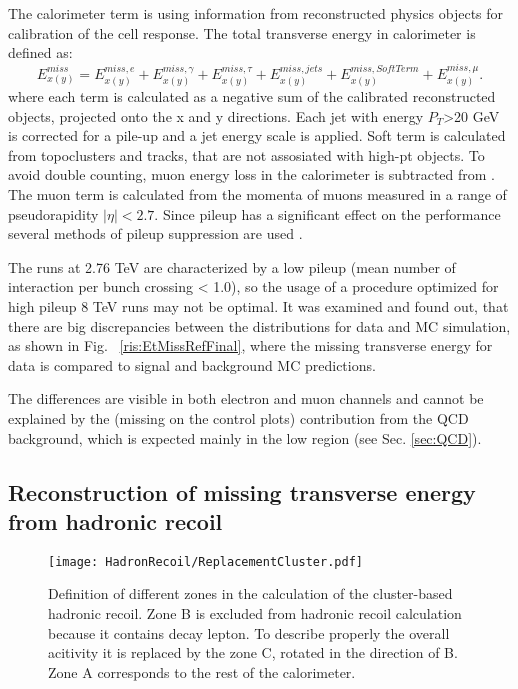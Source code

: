 The calorimeter term is using information from reconstructed physics objects for calibration of the cell response. The total transverse energy in calorimeter is defined as:
\begin{equation}
E_{x(y)}^{miss} = E_{x(y)}^{miss, e} + E_{x(y)}^{miss, \gamma} + E_{x(y)}^{miss, \tau} + E_{x(y)}^{miss, jets} + E_{x(y)}^{miss,SoftTerm} + E_{x(y)}^{miss, \mu}.
\end{equation}
where each term is calculated as a negative sum of the calibrated reconstructed objects, projected onto the x and y directions. Each jet with energy $P_T$>20 GeV is corrected for a pile-up and a jet energy scale is applied. Soft term is calculated from topoclusters and tracks, that are not assosiated with high-pt objects. To avoid double counting, muon energy loss  in the calorimeter is  subtracted from \etmiss.  The \etmiss muon term is calculated from the momenta of muons measured in a range of pseudorapidity $| \eta | < 2.7 $. Since pileup has a significant effect on the \etmiss performance several methods of pileup suppression are used \cite{ATLAS-CONF-2014-019}.

The runs at 2.76 TeV are characterized by a low pileup (mean number of interaction per bunch crossing < 1.0), so the usage of a procedure optimized for high pileup 8 TeV runs may not be optimal. It was examined and found out, that there are big discrepancies between the \etmiss distributions for data and MC simulation, as shown in Fig. ~\ref{ris:EtMissRefFinal}, where the missing transverse energy for data is compared to signal and background MC predictions. 

The differences are visible in both electron and muon channels and cannot be explained by the (missing on the control plots) contribution from the QCD background, which is expected mainly in the low \etmiss region (see Sec. \ref{sec:QCD}). 



\subsection{Reconstruction of missing transverse energy from hadronic recoil}


\begin{figure}[!tbp]
\begin{center}
\begin{minipage}[h]{0.49\linewidth}
\texttt{[image: HadronRecoil/ReplacementCluster.pdf]}
\end{minipage}

\caption{Definition of different zones in the calculation of the cluster-based hadronic recoil. Zone B is excluded from hadronic recoil calculation because it contains decay lepton. To describe properly the overall acitivity it is replaced by the zone C, rotated in the direction of B. Zone A corresponds to the rest of the calorimeter\cite{HRPlots}.}
\label{ris:subsCone}
\end{center}
\end{figure}

